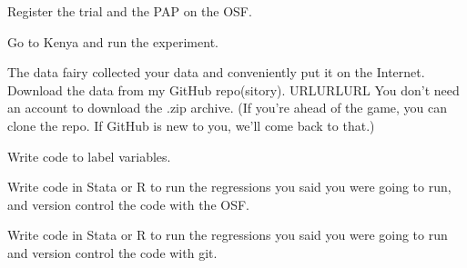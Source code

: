 \documentclass[addpoints,10pt]{exam}
\begin{document}
\begin{questions}

\question
Register the trial and the PAP on the OSF. 

\question 
Go to Kenya and run the experiment.
 
\question
The data fairy collected your data and conveniently put it on the Internet. Download the data from my GitHub repo(sitory). URLURLURL You don't need an account to download the .zip archive. (If you're ahead of the game, you can clone the repo. If GitHub is new to you, we'll come back to that.)

\question 
Write code to label variables.

\question
Write code in Stata or R to run the regressions you said you were going to run, and version control the code with the OSF.

\question
Write code in Stata or R to run the regressions you said you were going to run and version control the code with git.
\end{questions}
\end{document}
